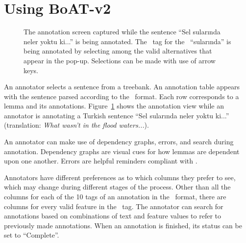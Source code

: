 \section{Using BoAT-v2}
\label{sec:annotation}


\begin{figure}[th!]
    \centering
    \caption{The annotation screen captured while the sentence ``Sel sularında neler yoktu ki...'' is being annotated. The \deprel\ tag for the \form\ ``sularında'' is being annotated by selecting among the valid alternatives that appear in the pop-up. Selections can be made with use of arrow keys.}
    \label{fig:anno-fig}
\end{figure}


An annotator selects a sentence from a treebank.
An annotation table appears with the sentence parsed according to the \ud\ format.
Each row corresponds to a lemma and its annotations.
Figure~\ref{fig:anno-fig} shows the annotation view while an annotator is annotating a Turkish sentence ``Sel sularında neler yoktu ki...'' (translation: \textit{What wasn't in the flood waters...}).

An annotator can make use of dependency graphs, errors, and search during annotation.
Dependency graphs are visual cues for how lemmas are dependent upon one another.
Errors are helpful reminders compliant with \ud.

Annotators have different preferences as to which columns they prefer to see, which may change during different stages of the process.
Other than all the columns for each of the 10 tags of an annotation in the \conllu\ format, there are columns for every valid feature in the \feats\ tag.
The annotator can search for annotations based on combinations of text and feature values to refer to previously made annotations.
When an annotation is finished, its status can be set to ``Complete''.
